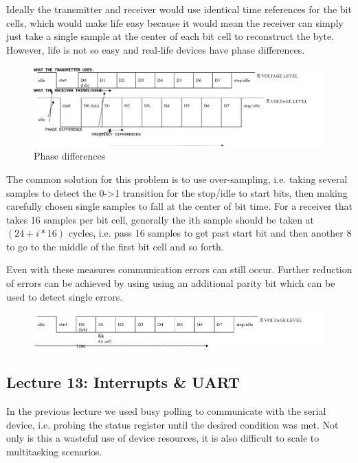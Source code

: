 \documentclass[../notes.tex]{subfiles}
\begin{document}
Ideally the transmitter and receiver would use identical time references for the bit cells, which would make life easy because it would mean the receiver can simply just take a single sample at the center of each bit cell to reconstruct the byte. 
However, life is not so easy and real-life devices have phase differences. 
\begin{figure}[H]
	\centering
	\includegraphics[width=0.8\linewidth]{img/image_2022-10-16-03-26-20.png}
	\caption{Phase differences}
\end{figure}


The common solution for this problem is to use over-sampling, i.e. taking several samples to detect the 0->1 transition for the stop/idle to start bits, then making carefully chosen single samples to fall at the center of bit time. 
For a receiver that takes 16 samples per bit cell, generally the ith sample should be taken at $ (24 + i * 16) $  cycles, i.e. pass 16 samples to get past start bit and then another 8 to go to the middle of the first bit cell and so forth.

Even with these measures communication errors can still occur. Further reduction of errors can be achieved by using using an additional parity bit which can be used to detect single errors.



\begin{figure}[H]
	\centering
	\includegraphics[width=0.8\linewidth]{img/image_2022-10-16-03-23-05.png}
\end{figure}

\subsection{Lecture 13: Interrupts \& UART}
In the previous lecture we used busy polling to communicate with the serial device, i.e. probing the status register until the desired condition was met.
Not only is this a wasteful use of device resources, it is also difficult to scale to multitasking scenarios.
\end{document}
